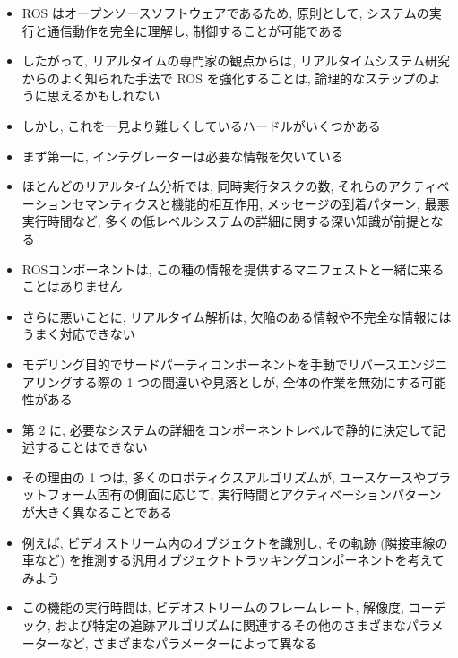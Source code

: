 \begin{frame}{}
    \begin{itemize}
        \item ROS はオープンソースソフトウェアであるため, 原則として, システムの実行と通信動作を完全に理解し, 制御することが可能である
        \item したがって, リアルタイムの専門家の観点からは, リアルタイムシステム研究からのよく知られた手法で ROS を強化することは, 論理的なステップのように思えるかもしれない
        \item しかし, これを一見より難しくしているハードルがいくつかある
    \end{itemize}
\end{frame}

\begin{frame}{}
    \begin{itemize}
        \item まず第一に, インテグレーターは必要な情報を欠いている
        \item ほとんどのリアルタイム分析では, 同時実行タスクの数, それらのアクティベーションセマンティクスと機能的相互作用, メッセージの到着パターン, 最悪実行時間など, 多くの低レベルシステムの詳細に関する深い知識が前提となる
        \item ROSコンポーネントは, この種の情報を提供するマニフェストと一緒に来ることはありません
        \item さらに悪いことに, リアルタイム解析は, 欠陥のある情報や不完全な情報にはうまく対応できない
        \item モデリング目的でサードパーティコンポーネントを手動でリバースエンジニアリングする際の 1 つの間違いや見落としが, 全体の作業を無効にする可能性がある
    \end{itemize}
\end{frame}

\begin{frame}{}
    \begin{itemize}
        \item 第 2 に, 必要なシステムの詳細をコンポーネントレベルで静的に決定して記述することはできない
        \item その理由の 1 つは, 多くのロボティクスアルゴリズムが, ユースケースやプラットフォーム固有の側面に応じて, 実行時間とアクティベーションパターンが大きく異なることである
        \item 例えば, ビデオストリーム内のオブジェクトを識別し, その軌跡 (隣接車線の車など) を推測する汎用オブジェクトトラッキングコンポーネントを考えてみよう
        \item この機能の実行時間は, ビデオストリームのフレームレート, 解像度, コーデック, および特定の追跡アルゴリズムに関連するその他のさまざまなパラメーターなど, さまざまなパラメーターによって異なる
    \end{itemize}
\end{frame}

